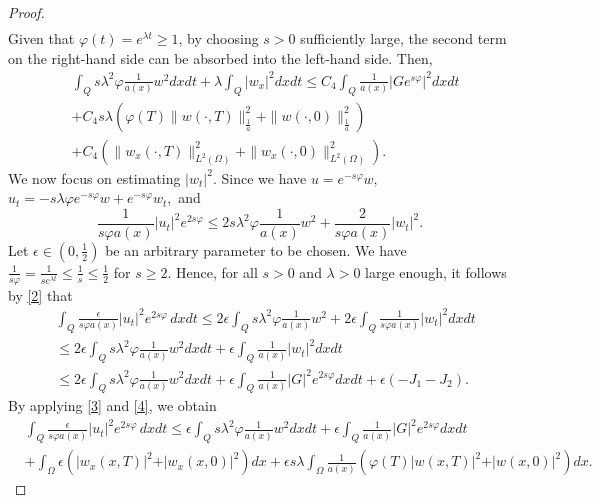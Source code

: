 \documentclass[reqno]{amsart}
\theoremstyle{plain}
\theoremstyle{remark}
\numberwithin{equation}{section}
\begin{document}
\begin{proof}
\begin{align*}
\end{align*}
Given that $\varphi(t)=e^{\lambda t}\geqslant 1$, by choosing $s>0$ sufficiently large, the second term on the right-hand side can be absorbed into the left-hand side. Then,
\begin{equation}\label{8}
\begin{aligned}
    &\int_{Q} s\lambda^2 \varphi \frac{1}{a(x)}w^2 dxdt+\lambda \int_{Q}\vert w_{x}\vert^2  dx dt \leqslant C_{4}  \int_{Q}\frac{1}{a(x)}\vert Ge^{s\varphi}\vert^2 dxdt \\&+C_{4}s\lambda \left(\varphi(T)\| w(\cdot,T)\|_{\frac{1}{a}}^2+\| w(\cdot,0)\|_{\frac{1}{a}}^2 \right)\\& +C_{4}\left( \| w_{x}(\cdot,T)\|_{L^2(\Omega)}^2+\| w_{x}(\cdot,0)\|_{L^2(\Omega)}^2\right).
\end{aligned}
\end{equation}
We now focus on estimating $\vert w_{t}\vert^2$. Since we have $u=e^{-s\varphi}w,$ $u_{t}=-s\lambda \varphi e^{-s\varphi}w+e^{-s\varphi}w_{t},$ and 
$$ \frac{1}{s\varphi a(x)}\vert u_{t}\vert^2e^{2s\varphi }\leqslant 2s\lambda^2 \varphi\frac{1}{a(x)} w^2+\frac{2}{s\varphi a(x)}\vert w_{t}\vert^2. $$
Let $\epsilon \in \left(0,\frac{1}{2}\right)$ be an arbitrary parameter to be chosen. We have $\frac{1}{s\varphi}= \frac{1}{se^{\lambda t}}\leq \frac{1}{s}\leq \frac{1}{2}$ for $s \geqslant 2.$ Hence, for all $s>0$ and $\lambda> 0$ large enough, it follows by \eqref{2} that 
\begin{equation*}
    \begin{aligned}
        &\int_{Q}\frac{\epsilon}{s\varphi a(x)}\vert u_{t}\vert^2 e^{2s\varphi}\, dxdt\leqslant 2\epsilon\int_{Q} s \lambda^2 \varphi \frac{1}{a(x)}w^2+2\epsilon\int_{Q}\frac{1}{s\varphi a(x)}\vert w_{t}\vert^2dxdt\\ &\leqslant 2\epsilon \int_{Q}s\lambda^2\varphi \frac{1}{a(x)} w^2 dxdt+\epsilon \int_{Q}\frac{1}{a(x)}\vert w_{t}\vert^2dxdt\\ & \leqslant 2\epsilon \int_{Q} s\lambda^2\varphi \frac{1}{a(x)} w^2 dxdt + \epsilon \int_{Q} \frac{1}{a(x)} \vert G\vert^2 e^{2s\varphi}dxdt + \epsilon \left(-J_{1}-J_{2}\right).
    \end{aligned}
\end{equation*}
By applying \eqref{3} and \eqref{4}, we obtain
\begin{equation}\label{10}
    \begin{aligned}
        &\int_{Q}\frac{\epsilon}{s\varphi a(x)}\vert u_{t}\vert^2 e^{2s\varphi}\, dxdt\leqslant \epsilon \int_{Q} s\lambda^2\varphi\frac{1}{a(x)} w^2 dxdt + \epsilon \int_{Q} \frac{1}{a(x)}\vert G\vert^2 e^{2s\varphi}dxdt \\ & +\int_{\Omega}\epsilon\left(\vert  w_{x}(x,T)\vert^2+ \vert   w_{x}(x,0)\vert^2\right)dx+\epsilon s\lambda \int_{\Omega}\frac{1}{a(x)}\left(\varphi(T)\vert w(x,T)\vert^2+\vert w(x,0)\vert^2\right)dx.

\end{aligned}
\end{equation}
\end{proof}
\end{document}
